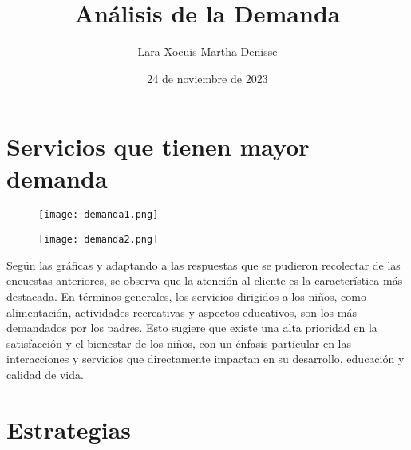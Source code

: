 \documentclass[letterpaper,12pt]{article}
\title {\textbf{Análisis de la Demanda}}
\author{Lara Xocuis Martha Denisse}
\date{24 de noviembre de 2023}
\begin{document}
\maketitle
\newpage
\begin{sloppypar}
\section{Servicios que tienen mayor demanda}
\begin{figure}[H]
  \centering 
  \texttt{[image: demanda1.png]}
\end{figure}

\begin{figure}[H]
  \centering 
  \texttt{[image: demanda2.png]}
\end{figure}
Según las gráficas y adaptando a las respuestas que se pudieron recolectar de las encuestas anteriores, se observa que la atención al cliente es la característica más destacada. En términos generales, los servicios dirigidos a los niños, como alimentación, actividades recreativas y aspectos educativos, son los más demandados por los padres. Esto sugiere que existe una alta prioridad en la satisfacción y el bienestar de los niños, con un énfasis particular en las interacciones y servicios que directamente impactan en su desarrollo, educación y calidad de vida.
\section{Estrategias}

\end{sloppypar}
\end{document}
